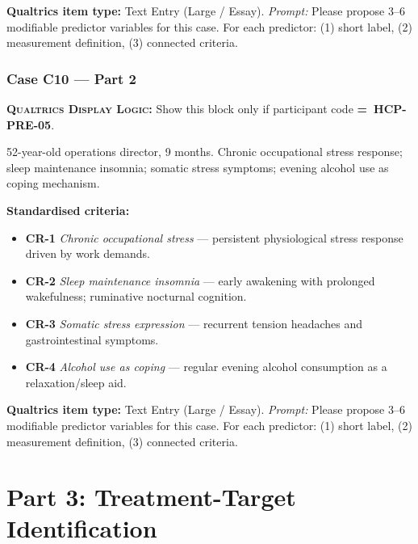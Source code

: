 \documentclass[11pt,a4paper]{article}
\newcommand{\responsetextarea}[1]{\begin{tcolorbox}[colback=ResponseBG,colframe=GoldAmber,boxrule=0.6pt,arc=1.5mm,left=6pt,right=6pt,top=5pt,bottom=5pt]\small\textbf{\color{GoldAmber}Qualtrics item type:} Text Entry (Large / Essay). \quad \textit{Prompt:} #1\end{tcolorbox}}
\newcommand{\dlnote}[1]{\par\vspace{0.15em}\noindent\begin{tcolorbox}[colback=AccentAmber,colframe=GoldAmber,boxrule=0.45pt,arc=1mm,left=5pt,right=5pt,top=2.5pt,bottom=2.5pt]\footnotesize\textbf{\color{GoldAmber}\scshape Qualtrics Display Logic:} Show this block only if participant code \textbf{=~#1}.\end{tcolorbox}\vspace{0.1em}}
\begin{document}
\responsetextarea{Please propose 3--6 modifiable predictor variables for this case. For each predictor: (1) short label, (2) measurement definition, (3) connected criteria.}

\vspace{0.4em}

\subsubsection*{Case C10 --- Part 2}
\dlnote{HCP-PRE-05}

\begin{complaintbox}[title=Case C10 --- Complaint (abbreviated)]
\small 52-year-old operations director, 9 months. Chronic occupational stress response; sleep maintenance insomnia; somatic stress symptoms; evening alcohol use as coping mechanism.
\end{complaintbox}

\begin{contextbox}
\small\textbf{Standardised criteria:}
\begin{itemize}[topsep=2pt,itemsep=1pt]
\item \textbf{CR-1} \textit{Chronic occupational stress} --- persistent physiological stress response driven by work demands.
\item \textbf{CR-2} \textit{Sleep maintenance insomnia} --- early awakening with prolonged wakefulness; ruminative nocturnal cognition.
\item \textbf{CR-3} \textit{Somatic stress expression} --- recurrent tension headaches and gastrointestinal symptoms.
\item \textbf{CR-4} \textit{Alcohol use as coping} --- regular evening alcohol consumption as a relaxation/sleep aid.
\end{itemize}
\end{contextbox}

\responsetextarea{Please propose 3--6 modifiable predictor variables for this case. For each predictor: (1) short label, (2) measurement definition, (3) connected criteria.}

\newpage

\section{Part 3: Treatment-Target Identification}
\end{document}
